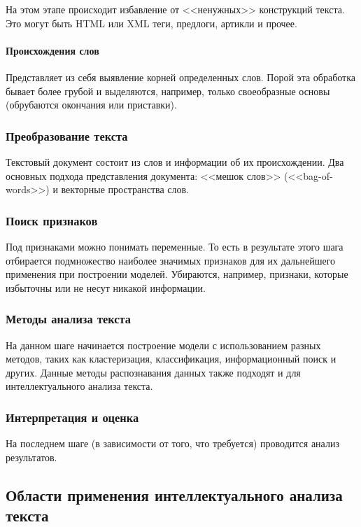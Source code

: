 \documentclass[14pt]{matmex-diploma-custom}
\begin{document}
На этом этапе происходит избавление от <<ненужных>> конструкций текста. Это могут быть HTML или XML теги, предлоги, артикли и прочее.

\paragraph{Происхождения слов} 

Представляет из себя выявление корней определенных слов. Порой эта обработка бывает более грубой и выделяются, например, только своеобразные основы (обрубаются окончания или приставки).

\subsubsection{Преобразование текста}

Текстовый документ состоит из слов и информации об их происхождении. Два основных подхода представления документа: <<мешок слов>> (<<bag-of-words>>) и векторные пространства слов.

\subsubsection{Поиск признаков}

Под признаками можно понимать переменные. То есть в результате этого шага отбирается подмножество наиболее значимых признаков для их дальнейшего применения при построении моделей. Убираются, например, признаки, которые избыточны или не несут никакой информации.

\subsubsection{Методы анализа текста}

На данном шаге начинается построение модели с использованием разных методов, таких как кластеризация, классификация, информационный поиск и других. Данные методы распознавания данных также подходят и для интеллектуального анализа текста.

\subsubsection{Интерпретация и оценка}

На последнем шаге (в зависимости от того, что требуется) проводится анализ результатов.

\subsection{Области применения интеллектуального анализа текста}
\end{document}
